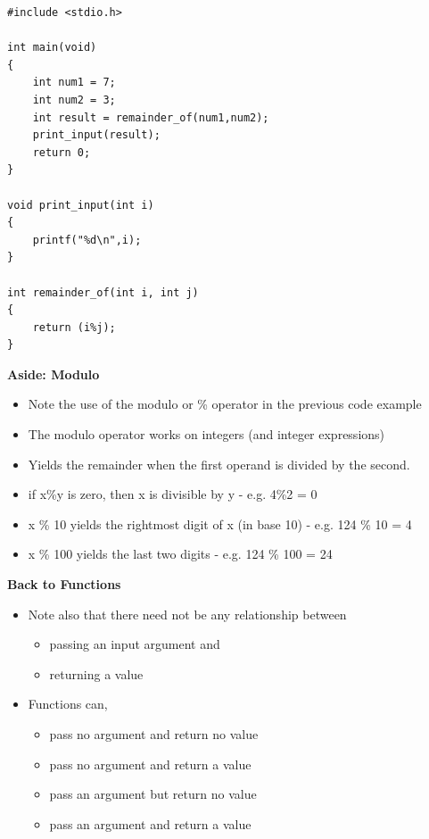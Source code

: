\documentclass{beamer}
\begin{document}
\begin{frame}[fragile]
\begin{block}{}
\begin{lstlisting}
#include <stdio.h>

int main(void) 
{
    int num1 = 7;
    int num2 = 3;
    int result = remainder_of(num1,num2);
    print_input(result);
    return 0;
}

void print_input(int i)
{
    printf("%d\n",i);
}

int remainder_of(int i, int j)
{
    return (i%j);
}
\end{lstlisting}
\end{block}

\end{frame}

\begin{frame}
\textbf{Aside: Modulo}
\begin{itemize}
\item Note the use of the modulo or \% operator in the previous code example
\item The modulo operator works on integers (and integer expressions) 
\item Yields the remainder when the first operand is divided by the second. 
\end{itemize}
\end{frame}

\begin{frame}
\begin{itemize}
\item if x\%y is zero, then x is divisible by y  - e.g. 4\%2 = 0 
\item x \% 10 yields the rightmost digit of x (in base 10) - e.g. 124 \% 10 = 4
\item x \% 100 yields the last two digits - e.g. 124 \% 100 = 24
\end{itemize}
\end{frame}

\begin{frame}
 
\textbf{Back to Functions}
 
\begin{itemize}
\item Note also that there need not be any relationship between
\begin{itemize}
\item passing an input argument and
\item returning a value
\end{itemize}
\item Functions can,
\begin{itemize}
\item pass no argument and return no value
\item pass no argument and return a value
\item pass an argument but return no value
\item pass an argument and return a value 
\end{itemize}
\end{itemize}
\end{frame}
\end{document}
